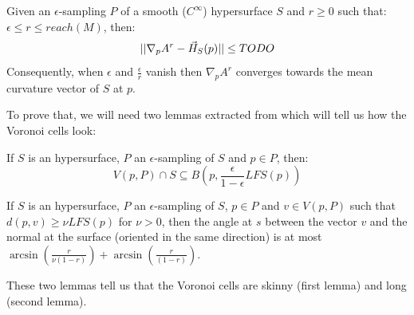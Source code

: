 \begin{proposition}
    Given an $\epsilon$-sampling $ P $ of a smooth ($ C^{\infty} $) hypersurface
    $ S $ and $ r \ge 0 $ such that: $ \epsilon \leq r \leq reach(M) $, then:
    \begin{equation}
        || \nabla_p A^r - \vec{H}_{S}(p) || \leq TODO
    \end{equation}
    Consequently, when $ \epsilon $ and $ \frac{\epsilon}{r} $ vanish then
    $ \nabla_p A^r $ converges towards the mean curvature vector of $ S $ at $ p $.
    \label{prop:gradient-mean-curvature}
\end{proposition}

To prove that, we will need two lemmas extracted from \cite{amenta1999surface}
which will tell us how the Voronoi cells look:
\begin{lemma}
    If $ S $ is an hypersurface, $ P $ an $\epsilon$-sampling of $ S $ and $ p
    \in P $, then:
    $$ V(p, P) \cap S \subseteq B\left(p, \frac{\epsilon}{1 - \epsilon}
        LFS(p)\right) $$
\end{lemma}

\begin{lemma}
    If $ S $ is an hypersurface, $ P $ an $\epsilon$-sampling of $ S $, $ p
    \in P $ and $ v \in V(p, P) $ such that $ d(p, v) \ge \nu LFS(p) $ for $ \nu
    > 0 $, then the angle at $ s $ between the vector $ v $ and the normal at
    the surface (oriented in the same direction) is at most $
    \arcsin(\frac{r}{\nu(1-r)}) + \arcsin(\frac{r}{(1-r)}) $.
\end{lemma}

These two lemmas tell us that the Voronoi cells are skinny (first lemma) and
long (second lemma).

